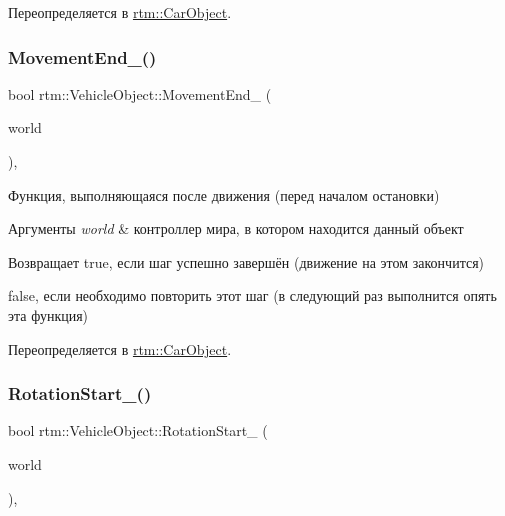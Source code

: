 Переопределяется в \hyperlink{classrtm_1_1_car_object_abe89fea4893e244d9f6fb17c596b5ae0}{rtm\+::\+Car\+Object}.

\mbox{\label{classrtm_1_1_vehicle_object_a7e6c94902d1d544006ca8de63ba36860}} 
\subsubsection{\texorpdfstring{Movement\+End\+\_\+()}{MovementEnd\_()}}
{\footnotesize\ttfamily bool rtm\+::\+Vehicle\+Object\+::\+Movement\+End\+\_\+ (\begin{DoxyParamCaption}\item[{\hyperlink{classrtm_1_1_world_controller}{World\+Controller} $\ast$const}]{world }\end{DoxyParamCaption})\hspace{0.3cm}{\ttfamily [protected]}, {\ttfamily [virtual]}}



Функция, выполняющаяся после движения (перед началом остановки) 


\begin{DoxyParams}{Аргументы}
{\em world} & контроллер мира, в котором находится данный объект \\
\hline
\end{DoxyParams}
\begin{DoxyReturn}{Возвращает}
true, если шаг успешно завершён (движение на этом закончится) 

false, если необходимо повторить этот шаг (в следующий раз выполнится опять эта функция) 
\end{DoxyReturn}


Переопределяется в \hyperlink{classrtm_1_1_car_object_a24354013f953386699bbb3f4464adb0c}{rtm\+::\+Car\+Object}.

\mbox{\label{classrtm_1_1_vehicle_object_a2c449bdf4d8e954fe7bd06de4b64deb7}} 
\subsubsection{\texorpdfstring{Rotation\+Start\+\_\+()}{RotationStart\_()}}
{\footnotesize\ttfamily bool rtm\+::\+Vehicle\+Object\+::\+Rotation\+Start\+\_\+ (\begin{DoxyParamCaption}\item[{\hyperlink{classrtm_1_1_world_controller}{World\+Controller} $\ast$const}]{world }\end{DoxyParamCaption})\hspace{0.3cm}{\ttfamily [protected]}, {\ttfamily [virtual]}}



